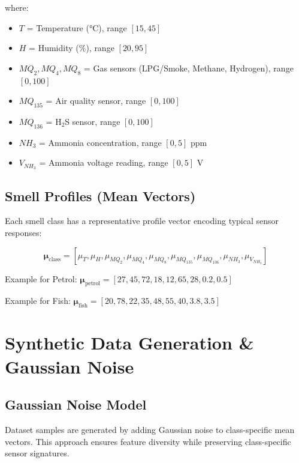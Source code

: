 \documentclass[10pt]{article}
\begin{document}
where:
\begin{itemize}
    \item $T$ = Temperature (°C), range $[15, 45]$
    \item $H$ = Humidity (\%), range $[20, 95]$
    \item $MQ_2, MQ_4, MQ_8$ = Gas sensors (LPG/Smoke, Methane, Hydrogen), range $[0, 100]$
    \item $MQ_{135}$ = Air quality sensor, range $[0, 100]$
    \item $MQ_{136}$ = H$_2$S sensor, range $[0, 100]$
    \item $NH_3$ = Ammonia concentration, range $[0, 5]$ ppm
    \item $V_{NH_3}$ = Ammonia voltage reading, range $[0, 5]$ V
\end{itemize}

\subsection{Smell Profiles (Mean Vectors)}

Each smell class has a representative profile vector encoding typical sensor responses:

\[
\boldsymbol{\mu}_{\text{class}} = [\mu_T, \mu_H, \mu_{MQ_2}, \mu_{MQ_4}, \mu_{MQ_8}, \mu_{MQ_{135}}, \mu_{MQ_{136}}, \mu_{NH_3}, \mu_{V_{NH_3}}]
\]

Example for Petrol: $\boldsymbol{\mu}_{\text{petrol}} = [27, 45, 72, 18, 12, 65, 28, 0.2, 0.5]$

Example for Fish: $\boldsymbol{\mu}_{\text{fish}} = [20, 78, 22, 35, 48, 55, 40, 3.8, 3.5]$


\section{Synthetic Data Generation \& Gaussian Noise}

\subsection{Gaussian Noise Model}

Dataset samples are generated by adding Gaussian noise to class-specific mean vectors. This approach ensures feature diversity while preserving class-specific sensor signatures.
\end{document}
